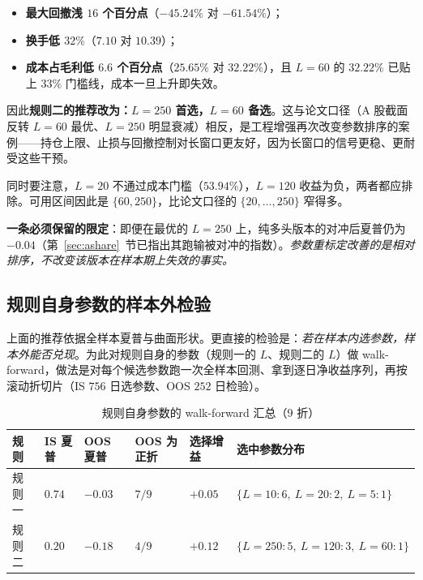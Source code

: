 \begin{itemize}[leftmargin=2.2em]
  \item \textbf{最大回撤浅 $16$ 个百分点}（$-45.24\%$ 对 $-61.54\%$）；
  \item \textbf{换手低 $32\%$}（$7.10$ 对 $10.39$）；
  \item \textbf{成本占毛利低 $6.6$ 个百分点}（$25.65\%$ 对 $32.22\%$），且 $L=60$ 的 $32.22\%$ 已贴上 $33\%$ 门槛线，成本一旦上升即失效。
\end{itemize}

因此\textbf{规则二的推荐改为：$L=250$ 首选，$L=60$ 备选}。这与论文口径（A 股截面反转 $L=60$ 最优、$L=250$ 明显衰减）相反，是工程增强再次改变参数排序的案例——持仓上限、止损与回撤控制对长窗口更友好，因为长窗口的信号更稳、更耐受这些干预。

同时要注意，$L=20$ 不通过成本门槛（$53.94\%$），$L=120$ 收益为负，两者都应排除。可用区间因此是 $\{60, 250\}$，比论文口径的 $\{20,\dots,250\}$ 窄得多。

\textbf{一条必须保留的限定}：即便在最优的 $L=250$ 上，纯多头版本的对冲后夏普仍为 $-0.04$（第~\ref{sec:ashare}~节已指出其跑输被对冲的指数）。\emph{参数重标定改善的是相对排序，不改变该版本在样本期上失效的事实。}

\subsection{规则自身参数的样本外检验}

上面的推荐依据全样本夏普与曲面形状。更直接的检验是：\emph{若在样本内选参数，样本外能否兑现}。为此对规则自身的参数（规则一的 $L$、规则二的 $L$）做 walk-forward，做法是对每个候选参数跑一次全样本回测、拿到逐日净收益序列，再按滚动折切片（IS $756$ 日选参数、OOS $252$ 日检验）。

\begin{table}[htbp]
\centering\footnotesize
\caption{规则自身参数的 walk-forward 汇总（$9$ 折）}\label{tab:rulewf}
\begin{tabular}{@{}>{\raggedright\arraybackslash}p{3.0cm}>{\raggedright\arraybackslash}p{1.8cm}>{\raggedright\arraybackslash}p{1.8cm}>{\raggedright\arraybackslash}p{2.0cm}>{\raggedright\arraybackslash}p{1.8cm}>{\raggedright\arraybackslash}p{2.6cm}@{}}
\toprule
\textbf{规则} & \textbf{IS 夏普} & \textbf{OOS 夏普} & \textbf{OOS 为正折} & \textbf{选择增益} & \textbf{选中参数分布} \\
\midrule
规则一 & $0.74$ & $-0.03$ & $7/9$ & $+0.05$ & $\{L{=}10:6,\ L{=}20:2,\ L{=}5:1\}$ \\
规则二 & $0.20$ & $-0.18$ & $4/9$ & $+0.12$ & $\{L{=}250:5,\ L{=}120:3,\ L{=}60:1\}$ \\
\bottomrule
\end{tabular}
\end{table}

